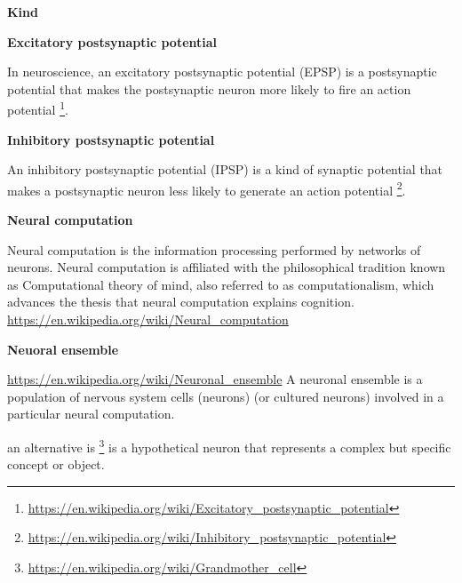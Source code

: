 \documentclass{book}
\providecommand{\ProjectDeepHeading}[2]{%
    \par\medskip\noindent\textbf{#2}\par\smallskip
}
\providecommand{\seeherefooter}[1]{\footnote{\url{#1}}}
\providecommand{\clickurlfooter}[1]{\footnote{\url{#1}}}
\begin{document}
\ProjectDeepHeading{10}{Kind}

\ProjectDeepHeading{11}{Excitatory postsynaptic potential}


In neuroscience, an excitatory postsynaptic potential (EPSP) is a postsynaptic potential that makes the postsynaptic neuron more likely to fire an action potential \seeherefooter{https://en.wikipedia.org/wiki/Excitatory_postsynaptic_potential}.

\ProjectDeepHeading{11}{Inhibitory postsynaptic potential}


An inhibitory postsynaptic potential (IPSP) is a kind of synaptic potential that makes a postsynaptic neuron less likely to generate an action potential \seeherefooter{https://en.wikipedia.org/wiki/Inhibitory_postsynaptic_potential}.

\ProjectDeepHeading{6}{Neural computation}


Neural computation is the information processing performed by networks of neurons. Neural computation is affiliated with the philosophical tradition known as Computational theory of mind, also referred to as computationalism, which advances the thesis that neural computation explains cognition.
    \url{https://en.wikipedia.org/wiki/Neural_computation}

\ProjectDeepHeading{7}{Neuoral ensemble}


\url{https://en.wikipedia.org/wiki/Neuronal_ensemble}
    A neuronal ensemble is a population of nervous system cells (neurons) (or cultured neurons) involved in a particular neural computation.
    
    an alternative is \clickurlfooter{https://en.wikipedia.org/wiki/Grandmother_cell}  is a hypothetical neuron that represents a complex but specific concept or object.
\end{document}
